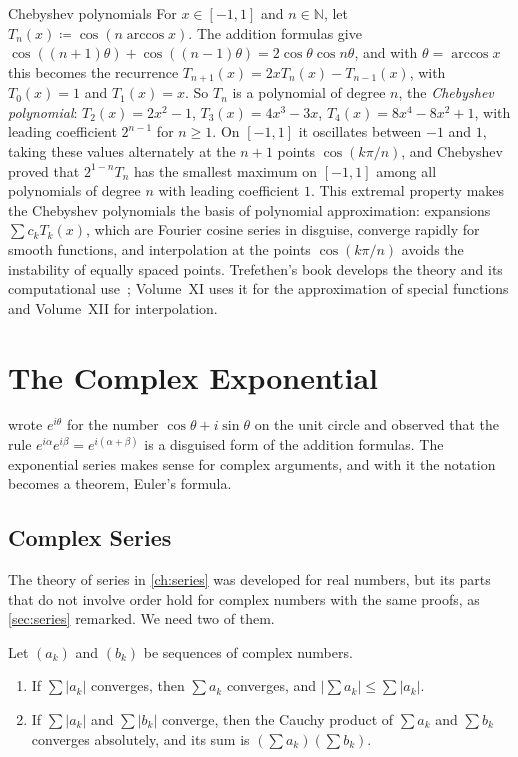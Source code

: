 \begin{note}{Chebyshev polynomials}
For $x\in[-1,1]$ and $n\in\mathbb N$, let $T_n(x)\coloneqq\cos(n\arccos x)$. The addition formulas give $\cos((n+1)\theta)+\cos((n-1)\theta)=2\cos\theta\cos n\theta$, and with $\theta=\arccos x$ this becomes the recurrence $T_{n+1}(x)=2xT_n(x)-T_{n-1}(x)$, with $T_0(x)=1$ and $T_1(x)=x$. So $T_n$ is a polynomial of degree $n$, the \emph{Chebyshev polynomial}: $T_2(x)=2x^2-1$, $T_3(x)=4x^3-3x$, $T_4(x)=8x^4-8x^2+1$, with leading coefficient $2^{n-1}$ for $n\ge1$. On $[-1,1]$ it oscillates between $-1$ and $1$, taking these values alternately at the $n+1$ points $\cos(k\pi/n)$, and Chebyshev proved that $2^{1-n}T_n$ has the smallest maximum on $[-1,1]$ among all polynomials of degree $n$ with leading coefficient $1$. This extremal property makes the Chebyshev polynomials the basis of polynomial approximation: expansions $\sum c_kT_k(x)$, which are Fourier cosine series in disguise, converge rapidly for smooth functions, and interpolation at the points $\cos(k\pi/n)$ avoids the instability of equally spaced points. Trefethen's book develops the theory and its computational use~\cite{trefethen2013atap}; Volume~XI uses it for the approximation of special functions and Volume~XII for interpolation.
\end{note}

\section{The Complex Exponential}
\label{sec:complex-exp}

 wrote $e^{i\theta}$ for the number $\cos\theta+i\sin\theta$ on the unit circle and observed that the rule $e^{i\alpha}e^{i\beta}=e^{i(\alpha+\beta)}$ is a disguised form of the addition formulas. The exponential series makes sense for complex arguments, and with it the notation becomes a theorem, Euler's formula.

\subsection{Complex Series}

The theory of series in \cref{ch:series} was developed for real numbers, but its parts that do not involve order hold for complex numbers with the same proofs, as \cref{sec:series} remarked. We need two of them.

\begin{lemma}
\label{lem:complex-series}
Let $(a_k)$ and $(b_k)$ be sequences of complex numbers.
\begin{enumerate}
\item If $\sum|a_k|$ converges, then $\sum a_k$ converges, and $|\sum a_k|\le\sum|a_k|$.
\item If $\sum|a_k|$ and $\sum|b_k|$ converge, then the Cauchy product of $\sum a_k$ and $\sum b_k$ converges absolutely, and its sum is $(\sum a_k)(\sum b_k)$.
\end{enumerate}
\end{lemma}

